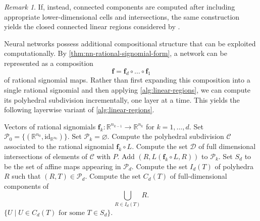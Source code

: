 \documentclass[10pt]{article}
\theoremstyle{definition}
\theoremstyle{remark}
\newtheorem{remark}[theorem]{Remark}
\newcommand{\RR}{{\mathbb{R}}}
\newcommand{\id}{\text{id}}
\renewcommand{\vec}[1]{\mathbf{#1}}
\def\vf{{\vec{f}}}
\begin{document}
\begin{remark}
If, instead, connected components are computed after including appropriate lower-dimensional cells and intersections, the same construction yields the closed connected linear regions considered by
\cite{stargalla2025computational}.
\end{remark}


Neural networks possess additional compositional structure that can be exploited computationally. By \cref{thm:nn-rational-signomial-form}, a network can be represented as a composition
$$
\vf = \vf_d \circ \ldots \circ \vf_1
$$
of rational signomial maps. Rather than first expanding this composition into a single rational signomial and then applying \cref{alg:linear-regions}, we can compute its polyhedral subdivision incrementally, one layer at a time. This yields the following layerwise variant of \cref{alg:linear-regions}.


\begin{algorithm}
  \caption{Layerwise linear regions of a composition}
    \begin{algorithmic}[1]
        \Require Vectors of rational signomials $\vf_k:\RR^{n_{k-1}}\to\RR^{n_k}$ for $k=1,\dotsc,d$.
        \State Set $\mathcal P_0=\{(\RR^{n_0},\id_{\RR^{n_0}})\}$. 
            \State Set $\mathcal P_k=\varnothing$. 
                \State Compute the polyhedral subdivision $\mathcal C$ associated to the rational signomial $\vf_k \circ L$.
                \State Compute the set $\mathcal D$ of full dimensional intersections of elements of $\mathcal C$ with $P$.
                    \State Add $(R,L(\vf_k\circ L,R))$ to $\mathcal P_k$.
                \EndFor
            \EndFor
        \EndFor
        \State Set $S_d$ to be the set of affine maps appearing in $\mathcal P_d$.
            \State Compute the set $I_d(T)$ of polyhedra $R$ such that $(R,T)\in\mathcal P_d$.
            \State Compute the set $C_d(T)$ of full-dimensional components of
            $$
                \bigcup_{R\in I_d(T)} R.
            $$
        \EndFor
        \State \Return $\{U\mid U \in C_d(T) \text{ for some } T \in S_d\}$.
    \end{algorithmic}
    \label{alg:layerwise-linear-regions}
\end{algorithm}
\end{document}
